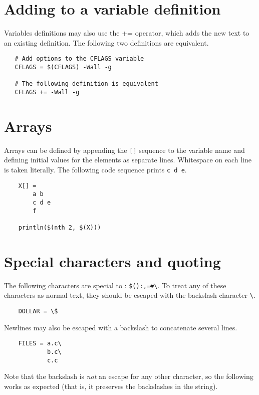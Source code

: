 \section{Adding to a variable definition}

Variables definitions may also use the += operator, which adds the new text to an existing
definition.  The following two definitions are equivalent.

\begin{verbatim}
   # Add options to the CFLAGS variable
   CFLAGS = $(CFLAGS) -Wall -g

   # The following definition is equivalent
   CFLAGS += -Wall -g
\end{verbatim}

\section{Arrays}

Arrays can be defined by appending the \verb+[]+ sequence to the variable name and defining initial
values for the elements as separate lines.  Whitespace on each line is
taken literally.  The following code sequence prints \verb+c d e+.

\begin{verbatim}
    X[] =
        a b
        c d e
        f

    println($(nth 2, $(X)))
\end{verbatim}

\section{Special characters and quoting}

The following characters are special to : \verb+$():,=#\+.  To treat
any of these characters as normal text, they should be escaped with the backslash
character \verb+\+.

\begin{verbatim}
    DOLLAR = \$
\end{verbatim}

Newlines may also be escaped with a backslash to concatenate several lines.

\begin{verbatim}
    FILES = a.c\
            b.c\
            c.c
\end{verbatim}

Note that the backslash is \emph{not} an escape for any other character, so the following
works as expected (that is, it preserves the backslashes in the string).

